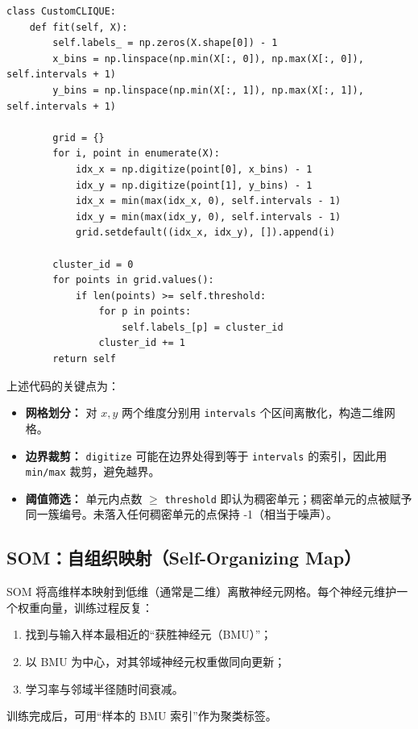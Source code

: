 \documentclass[runningheads]{ctexart}
\begin{document}
\begin{lstlisting}
class CustomCLIQUE:
	def fit(self, X):
		self.labels_ = np.zeros(X.shape[0]) - 1
		x_bins = np.linspace(np.min(X[:, 0]), np.max(X[:, 0]), self.intervals + 1)
		y_bins = np.linspace(np.min(X[:, 1]), np.max(X[:, 1]), self.intervals + 1)

		grid = {}
		for i, point in enumerate(X):
			idx_x = np.digitize(point[0], x_bins) - 1
			idx_y = np.digitize(point[1], y_bins) - 1
			idx_x = min(max(idx_x, 0), self.intervals - 1)
			idx_y = min(max(idx_y, 0), self.intervals - 1)
			grid.setdefault((idx_x, idx_y), []).append(i)

		cluster_id = 0
		for points in grid.values():
			if len(points) >= self.threshold:
				for p in points:
					self.labels_[p] = cluster_id
				cluster_id += 1
		return self
\end{lstlisting}

上述代码的关键点为：
\begin{itemize}
	\item \textbf{网格划分：} 对 $x,y$ 两个维度分别用 \texttt{intervals} 个区间离散化，构造二维网格。
	\item \textbf{边界裁剪：} \texttt{digitize} 可能在边界处得到等于 \texttt{intervals} 的索引，因此用 \texttt{min/max} 裁剪，避免越界。
	\item \textbf{阈值筛选：} 单元内点数 $\ge$ \texttt{threshold} 即认为稠密单元；稠密单元的点被赋予同一簇编号。未落入任何稠密单元的点保持 -1（相当于噪声）。
\end{itemize}

\subsection{SOM：自组织映射（Self-Organizing Map）}
SOM 将高维样本映射到低维（通常是二维）离散神经元网格。每个神经元维护一个权重向量，训练过程反复：
\begin{enumerate}
	\item 找到与输入样本最相近的“获胜神经元（BMU）”；
	\item 以 BMU 为中心，对其邻域神经元权重做同向更新；
	\item 学习率与邻域半径随时间衰减。
\end{enumerate}
训练完成后，可用“样本的 BMU 索引”作为聚类标签。
\end{document}
